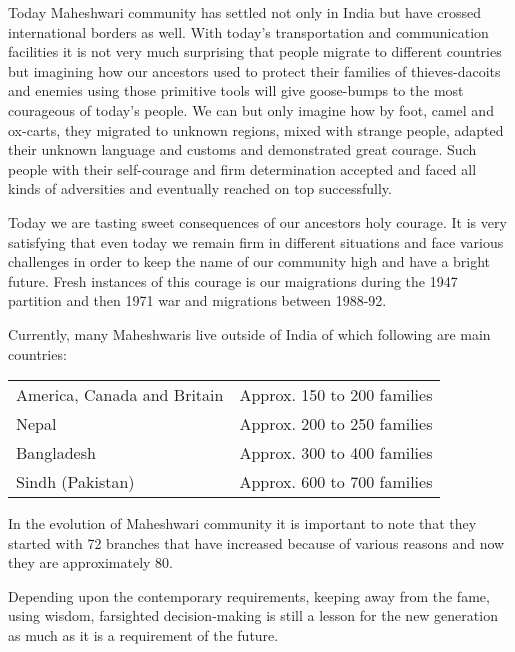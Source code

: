 Today Maheshwari community has settled not only in India but have crossed international borders as well. With today's transportation and communication facilities it is not very much surprising that people migrate to different countries but imagining how our ancestors used to protect their families of thieves-dacoits and enemies using those primitive tools will give goose-bumps to the most courageous of today's people. We can but only imagine how by foot, camel and ox-carts, they migrated to unknown regions, mixed with strange people, adapted their unknown language and customs and demonstrated great courage. Such people with their self-courage and firm determination accepted and faced all kinds of adversities and eventually reached on top successfully.

Today we are tasting sweet consequences of our ancestors holy courage. It is very satisfying that even today we remain firm in different situations and face various challenges in order to keep the name of our community high and have a bright future. Fresh instances of this courage is our maigrations during the 1947 partition and then 1971 war and migrations between 1988-92.

Currently, many Maheshwaris live outside of India of which following are main countries:
\begin{center}
\begin{tabular}{ll}
America, Canada and Britain & Approx. 150 to 200 families \\ 
Nepal & Approx. 200 to 250 families \\ 
Bangladesh & Approx. 300 to 400 families \\ 
Sindh (Pakistan) & Approx. 600 to 700 families
\end{tabular}
\end{center}

In the evolution of Maheshwari community it is important to note that they started with 72 branches that have increased because of various reasons and now they are approximately 80.

Depending upon the contemporary requirements, keeping away from the fame, using wisdom, farsighted decision-making is still a lesson for the new generation as much as it is a requirement of the future.
